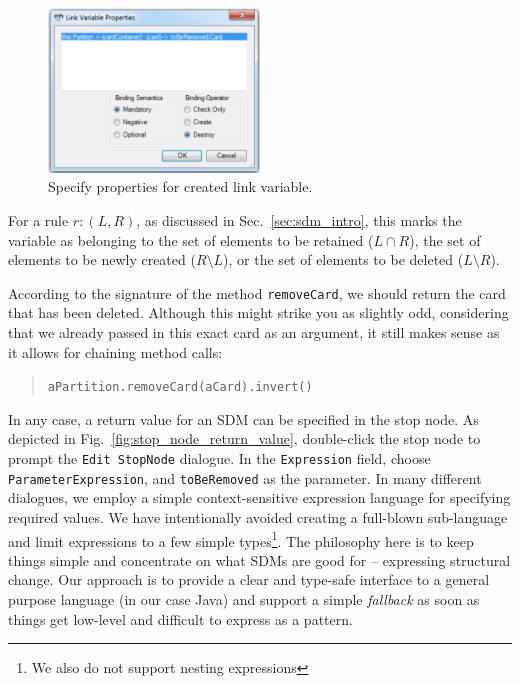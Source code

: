 \begin{figure}[htp] 
\begin{center}
  \includegraphics[width=0.5\textwidth]{pics/sdmBilder/removeCard/sdm12RAW}
  \caption{Specify properties for created link variable.}  
  \label{fig:link_variable_properties}
\end{center}
\end{figure}



For a rule $r: (L, R)$, as discussed in Sec.~\ref{sec:sdm_intro}, this marks the
variable as belonging to the set of elements to be retained ($L\cap R$), the set
of elements to be newly created ($R\setminus L$), or the set of elements to be
deleted ($L\setminus R$).
 
According to the signature of the method \texttt{removeCard}, we should return
the card that has been deleted.  Although this might strike you as slightly odd,
considering that we already passed in this exact card as an argument, it still
makes sense as it allows for chaining method calls:
\begin{quote}\texttt{aPartition.removeCard(aCard).invert()}\end{quote}
In any case, a return value for an SDM can be specified in the stop node.
As depicted in Fig.~\ref{fig:stop_node_return_value}, double-click the stop
node to prompt the \texttt{Edit StopNode} dialogue.
In the \texttt{Expression} field, choose \texttt{ParameterExpression}, and
\texttt{toBeRemoved} as the parameter.  In many different dialogues, we employ a
simple context-sensitive expression language for specifying required values.  We
have intentionally avoided creating a full-blown sub-language and limit
expressions to a few simple types\footnote{We also do not support nesting
expressions}.  The philosophy here is to keep things simple and concentrate on
what SDMs are good for -- expressing structural change.  Our approach is to
provide a clear and type-safe interface to a general purpose language (in our
case Java) and support a simple \emph{fallback} as soon as things get low-level
and difficult to express as a pattern.  


